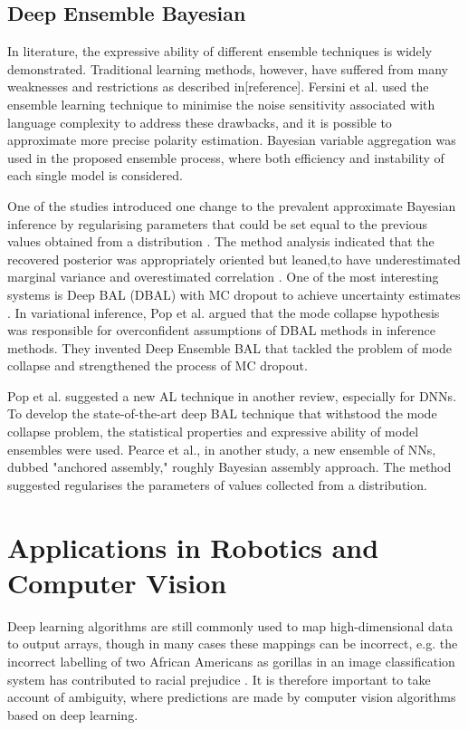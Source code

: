 \documentclass[journal]{IEEEtran}
\begin{document}
\subsection{Deep Ensemble Bayesian}

In literature, the expressive ability of
different ensemble techniques is widely demonstrated.
Traditional learning methods, however, have suffered from
many weaknesses and restrictions as described in[reference].
Fersini et al. used the ensemble learning technique to minimise the noise sensitivity associated with
language complexity to address these drawbacks, and it is possible to approximate more precise polarity estimation\cite{pearce2018uncertainty}.
Bayesian variable aggregation was used in the proposed ensemble process,
where both efficiency and instability of each single model is considered. 


One of the studies introduced one change to the prevalent approximate Bayesian inference by regularising parameters that could be set equal to the previous values obtained from a distribution \cite{gal2016uncertainty}. The method analysis indicated that the recovered posterior was appropriately oriented but leaned,to have underestimated marginal variance and overestimated correlation \cite{pearce2018uncertainty}.
One of the most interesting systems is Deep BAL (DBAL) with MC dropout to achieve uncertainty estimates \cite{abdar2020review}. In variational inference, Pop et al. argued that the mode collapse hypothesis was responsible for overconfident assumptions of DBAL methods in inference methods. They invented Deep Ensemble BAL that tackled the problem
of mode collapse and strengthened the process of MC dropout.


Pop et al. suggested a new AL technique in another review, especially for DNNs. To develop the state-of-the-art deep BAL technique that withstood the mode collapse problem, the statistical properties and expressive ability of model ensembles were used.\cite{pearce2018uncertainty}
Pearce et al., in another study, a new ensemble
of NNs, dubbed "anchored assembly," roughly Bayesian assembly approach.
The method suggested regularises the parameters of values collected from a distribution. 

\section{Applications in Robotics and Computer Vision}

Deep learning algorithms are still commonly used to map high-dimensional data to output arrays, though in many cases these mappings can be
incorrect, e.g. the incorrect labelling of two African Americans as gorillas in an image classification system has contributed to racial prejudice \cite{gal2016uncertainty}.
It is therefore important to take account of ambiguity, where
predictions are made by computer vision algorithms based on deep learning. 
\end{document}
